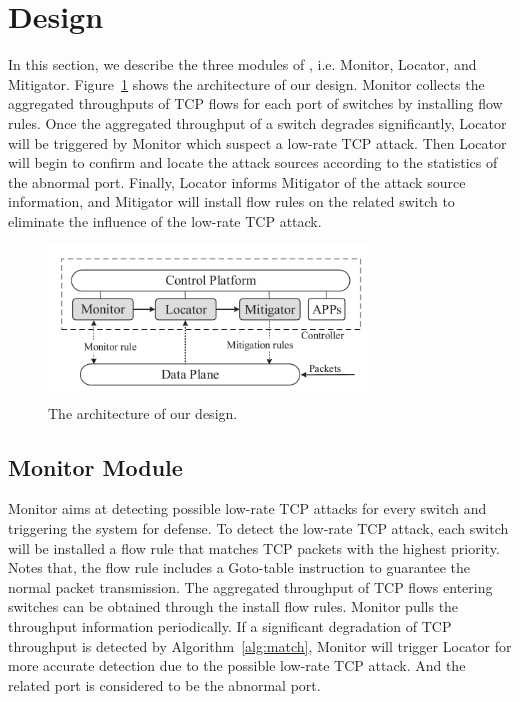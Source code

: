 \section{Design}
In this section, we describe the three modules of \TheName{}, i.e. 
Monitor, Locator, and Mitigator. Figure~\ref{fig:architecture} shows the architecture of our design. 
Monitor collects the aggregated throughputs of TCP flows for each port of switches by installing flow rules. 
Once the aggregated throughput of a switch degrades significantly, Locator will be triggered by Monitor which suspect a low-rate TCP attack. Then Locator will begin to confirm and locate the attack sources according to the statistics of the abnormal port. Finally, Locator informs Mitigator of the attack source information, and Mitigator will install flow rules on the related switch to eliminate the influence of the low-rate TCP attack. 


\begin{figure}
\vspace{0in}
\centering
\includegraphics[width=3.4in]{Design/architecture.pdf}
\vspace{-0.1in}
\caption{\small{The architecture of our design.}}
\label{fig:architecture}
\vspace{-0.2in}
\end{figure}


\subsection{Monitor Module}
Monitor aims at detecting possible low-rate TCP attacks for every switch and triggering the system for defense. To detect the low-rate TCP attack, each switch will be installed a flow rule that matches TCP packets with the highest priority. Notes that, the flow rule includes a Goto-table instruction to guarantee the normal packet transmission. The aggregated throughput of TCP flows entering switches can be obtained through the install flow rules. Monitor pulls the throughput information periodically. If a significant degradation of TCP throughput is detected by Algorithm~\ref{alg:match}, Monitor will trigger Locator for more accurate detection due to the possible low-rate TCP attack. And the related port is considered to be the abnormal port.  


